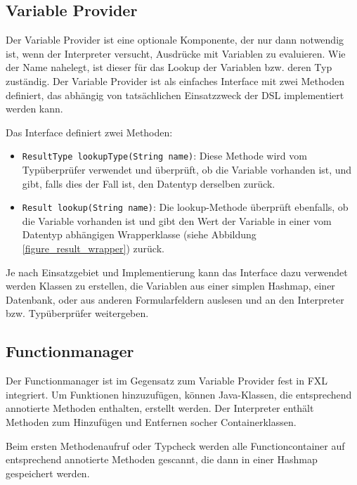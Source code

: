 \subsection{Variable Provider}

Der Variable Provider ist eine optionale Komponente, der nur dann notwendig ist, wenn der Interpreter versucht, Ausdrücke mit Variablen zu evaluieren. Wie der Name nahelegt, ist dieser für das Lookup der Variablen bzw. deren Typ zuständig. Der Variable Provider ist als einfaches Interface mit zwei Methoden definiert, das abhängig von tatsächlichen Einsatzzweck der DSL implementiert werden kann.

Das Interface definiert zwei Methoden:

\begin{itemize}

	\item \texttt{ResultType lookupType(String name)}: Diese Methode wird vom Typ\-über\-prü\-fer verwendet und überprüft, ob die Variable vorhanden ist, und gibt, falls dies der Fall ist, den Datentyp derselben zurück.
	
	\item \texttt{Result lookup(String name)}: Die lookup-Methode überprüft ebenfalls, ob die Variable vorhanden ist und gibt den Wert der Variable in einer vom Datentyp abhängigen Wrapperklasse (siehe Abbildung \ref{figure_result_wrapper}) zurück.
		
\end{itemize}

Je nach Einsatzgebiet und Implementierung kann das Interface dazu verwendet werden Klassen zu erstellen, die Variablen aus einer simplen Hashmap, einer Datenbank, oder aus anderen Formularfeldern auslesen und an den Interpreter bzw. Typüberprüfer weitergeben.

\subsection{Functionmanager}

Der Functionmanager ist im Gegensatz zum Variable Provider fest in FXL integriert. Um Funktionen hinzuzufügen, können Java-Klassen, die entsprechend annotierte Methoden enthalten, erstellt werden. Der Interpreter enthält Methoden zum Hinzufügen und Entfernen socher Containerklassen. 

Beim ersten Methodenaufruf oder Typcheck werden alle Functioncontainer auf entsprechend annotierte Methoden gescannt, die dann in einer Hashmap gespeichert werden.

